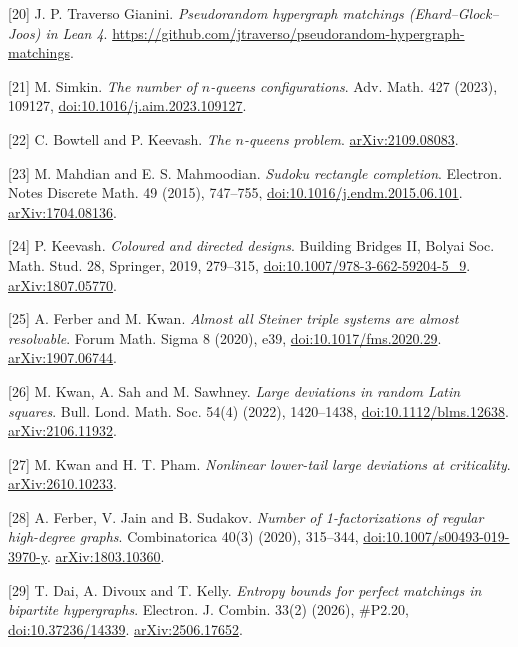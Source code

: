 \documentclass[spanish,11pt,a4paper]{article}
\begin{document}
{[}20{]} J. P. Traverso Gianini. \emph{Pseudorandom hypergraph matchings (Ehard--Glock--Joos) in Lean 4}. \url{https://github.com/jtraverso/pseudorandom-hypergraph-matchings}.

{[}21{]} M. Simkin. \emph{The number of \(n\)-queens configurations}. Adv. Math. 427 (2023), 109127, \href{https://doi.org/10.1016/j.aim.2023.109127}{doi:10.1016/j.aim.2023.109127}.

{[}22{]} C. Bowtell and P. Keevash. \emph{The \(n\)-queens problem}. \href{https://arxiv.org/abs/2109.08083}{arXiv:2109.08083}.

{[}23{]} M. Mahdian and E. S. Mahmoodian. \emph{Sudoku rectangle completion}. Electron. Notes Discrete Math. 49 (2015), 747--755, \href{https://doi.org/10.1016/j.endm.2015.06.101}{doi:10.1016/j.endm.2015.06.101}. \href{https://arxiv.org/abs/1704.08136}{arXiv:1704.08136}.

{[}24{]} P. Keevash. \emph{Coloured and directed designs}. Building Bridges II, Bolyai Soc. Math. Stud. 28, Springer, 2019, 279--315, \href{https://doi.org/10.1007/978-3-662-59204-5_9}{doi:10.1007/978-3-662-59204-5\_9}. \href{https://arxiv.org/abs/1807.05770}{arXiv:1807.05770}.

{[}25{]} A. Ferber and M. Kwan. \emph{Almost all Steiner triple systems are almost resolvable}. Forum Math. Sigma 8 (2020), e39, \href{https://doi.org/10.1017/fms.2020.29}{doi:10.1017/fms.2020.29}. \href{https://arxiv.org/abs/1907.06744}{arXiv:1907.06744}.

{[}26{]} M. Kwan, A. Sah and M. Sawhney. \emph{Large deviations in random Latin squares}. Bull. Lond. Math. Soc. 54(4) (2022), 1420--1438, \href{https://doi.org/10.1112/blms.12638}{doi:10.1112/blms.12638}. \href{https://arxiv.org/abs/2106.11932}{arXiv:2106.11932}.

{[}27{]} M. Kwan and H. T. Pham. \emph{Nonlinear lower-tail large deviations at criticality}. \href{https://arxiv.org/abs/2610.10233}{arXiv:2610.10233}.

{[}28{]} A. Ferber, V. Jain and B. Sudakov. \emph{Number of 1-factorizations of regular high-degree graphs}. Combinatorica 40(3) (2020), 315--344, \href{https://doi.org/10.1007/s00493-019-3970-y}{doi:10.1007/s00493-019-3970-y}. \href{https://arxiv.org/abs/1803.10360}{arXiv:1803.10360}.

{[}29{]} T. Dai, A. Divoux and T. Kelly. \emph{Entropy bounds for perfect matchings in bipartite hypergraphs}. Electron. J. Combin. 33(2) (2026), \#P2.20, \href{https://doi.org/10.37236/14339}{doi:10.37236/14339}. \href{https://arxiv.org/abs/2506.17652}{arXiv:2506.17652}.
\end{document}
